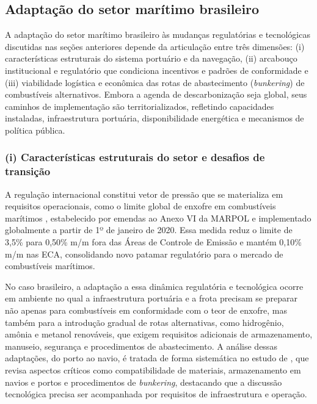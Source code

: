 \subsection{Adaptação do setor marítimo brasileiro}
A adaptação do setor marítimo brasileiro às mudanças regulatórias e tecnológicas discutidas nas seções anteriores depende da articulação entre três dimensões: (i) características estruturais do sistema portuário e da navegação, (ii) arcabouço institucional e regulatório que condiciona incentivos e padrões de conformidade e (iii) viabilidade logística e econômica das rotas de abastecimento (\emph{bunkering}) de combustíveis alternativos. Embora a agenda de descarbonização seja global, seus caminhos de implementação são territorializados, refletindo capacidades instaladas, infraestrutura portuária, disponibilidade energética e mecanismos de política pública.

\subsubsection{(i) Características estruturais do setor e desafios de transição}
A regulação internacional constitui vetor de pressão que se materializa em requisitos operacionais, como o limite global de enxofre em combustíveis marítimos \citep{imo_imo_2020}, estabelecido por emendas ao Anexo VI da \gls{MARPOL} e implementado globalmente a partir de 1º de janeiro de 2020. Essa medida reduz o limite de 3,5\% para 0,50\% m/m fora das Áreas de Controle de Emissão e mantém 0,10\% m/m nas \gls{ECA}, consolidando novo patamar regulatório para o mercado de combustíveis marítimos.

No caso brasileiro, a adaptação a essa dinâmica regulatória e tecnológica ocorre em ambiente no qual a infraestrutura portuária e a frota precisam se preparar não apenas para combustíveis em conformidade com o teor de enxofre, mas também para a introdução gradual de rotas alternativas, como hidrogênio, amônia e metanol renováveis, que exigem requisitos adicionais de armazenamento, manuseio, segurança e procedimentos de abastecimento. A análise dessas adaptações, do porto ao navio, é tratada de forma sistemática no estudo de \citet{wei_evaluating_2023}, que revisa aspectos críticos como compatibilidade de materiais, armazenamento em navios e portos e procedimentos de \emph{bunkering}, destacando que a discussão tecnológica precisa ser acompanhada por requisitos de infraestrutura e operação.


